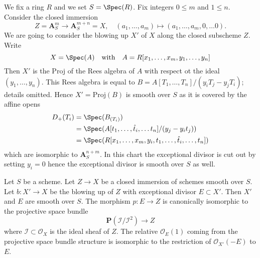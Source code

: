 \begin{remark}
\label{remark-relative-blowup}
We fix a ring $R$ and we set $S = \Spec(R)$. Fix integers $0 \leq m$ and
$1 \leq n$. Consider the closed immersion
$$
Z = \mathbf{A}^m_S \longrightarrow \mathbf{A}^{m + n}_S = X,\quad
(a_1, \ldots, a_m) \mapsto (a_1, \ldots, a_m, 0, \ldots 0).
$$
We are going to consider the blowing up $X'$ of $X$
along the closed subscheme $Z$. Write
$$
X = \Spec(A)
\quad\text{with}\quad
A = R[x_1, \ldots, x_m, y_1, \ldots, y_n]
$$
Then $X'$ is the Proj of the Rees algebra of $A$ with respect ot
the ideal $(y_1, \ldots, y_n)$. This Rees algebra is equal to
$B = A[T_1, \ldots, T_n]/(y_iT_j - y_jT_i)$; details omitted.
Hence $X' = \text{Proj}(B)$ is smooth over $S$ as it is
covered by the affine opens
\begin{align*}
D_+(T_i)
& =
\Spec(B_{(T_i)}) \\
& =
\Spec(A[t_1, \ldots, \hat t_i, \ldots t_n]/(y_j - y_i t_j)) \\
& =
\Spec(R[x_1, \ldots, x_m, y_i, t_1, \ldots, \hat t_i, \ldots, t_n])
\end{align*}
which are isomorphic to $\mathbf{A}^{n + m}_S$.
In this chart the exceptional divisor is cut out by
setting $y_i = 0$ hence the exceptional divisor is smooth
over $S$ as well.
\end{remark}

\begin{lemma}
\label{lemma-blowup}
Let $S$ be a scheme. Let $Z \to X$ be a closed immersion of schemes
smooth over $S$. Let $b : X' \to X$ be the blowing up of $Z$ with
exceptional divisor $E \subset X'$. Then $X'$ and $E$ are smooth
over $S$. The morphism $p : E \to Z$ is canonically isomorphic
to the projective space bundle
$$
\mathbf{P}(\mathcal{I}/\mathcal{I}^2) \longrightarrow Z
$$
where $\mathcal{I} \subset \mathcal{O}_X$ is the ideal sheaf
of $Z$. The relative $\mathcal{O}_E(1)$ coming from the projective
space bundle structure is isomorphic to the restriction of
$\mathcal{O}_{X'}(-E)$ to $E$.
\end{lemma}

